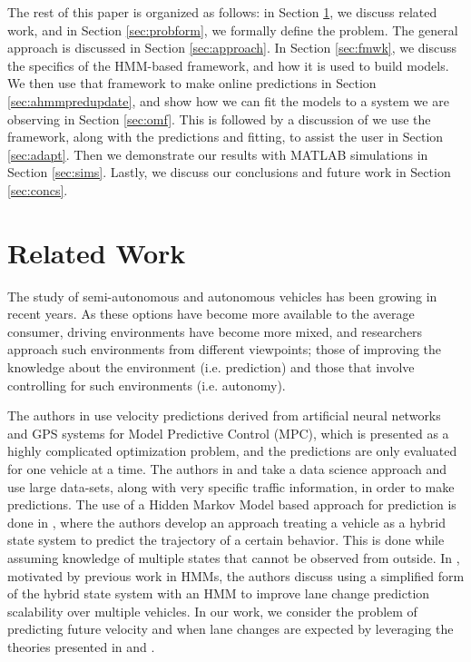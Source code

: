 \documentclass[letterpaper, 10 pt, conference]{ieeeconf}  %
\begin{document}
    
     
    The rest of this paper is organized as follows: in Section \ref{sec:relatedwork}, we discuss related work, and in Section \ref{sec:probform}, we formally define the problem. The general approach is discussed in Section \ref{sec:approach}. In Section \ref{sec:fmwk}, we discuss the specifics of the HMM-based framework, and how it is used to build models. We then use that framework to make online predictions in Section \ref{sec:ahmmpredupdate}, and show how we can fit the models to a system we are observing in Section \ref{sec:omf}. This is followed by a discussion of we use the framework, along with the predictions and fitting, to assist the user in Section \ref{sec:adapt}. Then we demonstrate our results with MATLAB simulations in Section \ref{sec:sims}. Lastly, we discuss our conclusions and future work in Section \ref{sec:concs}.

    

\section{Related Work} \label{sec:relatedwork}

The study of semi-autonomous and autonomous vehicles has been growing in recent years. As these options have become more available to the average consumer, driving environments have become more mixed, and researchers approach such environments from different viewpoints; those of improving the knowledge about the environment (i.e. prediction) and those that involve controlling for such environments (i.e. autonomy).

The authors in \cite{mpc} use velocity predictions derived from artificial neural networks and GPS systems for Model Predictive Control (MPC), which is presented as a highly complicated optimization problem, and the predictions are only evaluated for one vehicle at a time. The authors in \cite{velnn} and \cite{veldatadriv} take a data science approach and use large data-sets, along with very specific traffic information, in order to make predictions. The use of a Hidden Markov Model based approach for prediction is done in \cite{lanhmm}, where the authors develop an approach treating a vehicle as a hybrid state system to predict the trajectory of a certain behavior. This is done while assuming knowledge of multiple states that cannot be observed from outside. In \cite{woohmm}, motivated by previous work in HMMs, the authors discuss using a simplified form of the hybrid state system with an HMM to improve lane change prediction scalability over multiple vehicles. In our work, we consider the problem of predicting future velocity and when lane changes are expected by leveraging the theories presented in \cite{mpc} and \cite{woohmm}. 
\end{document}
